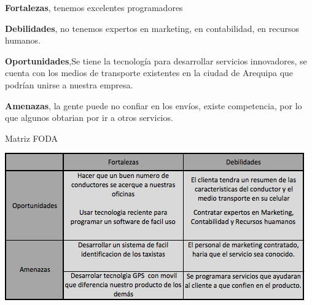 \textbf{Fortalezas}, tenemos excelentes programadores

\textbf{Debilidades}, no tenemos expertos en marketing, en contabilidad, en recursos humanos.

\textbf{Oportunidades},Se tiene la tecnología para desarrollar servicios innovadores, se cuenta con los medios de transporte existentes en la ciudad de Arequipa que podrían unirse a nuestra empresa.

\textbf{Amenazas}, la gente puede no confiar en los envíos, existe competencia, por lo que algunos obtarian por ir a otros servicios.


\begin{table}[]
\centering
\caption{Matriz FODA}
\label{tab:foda}
\includegraphics[scale=1.4]{tablaFODA}
\end{table}